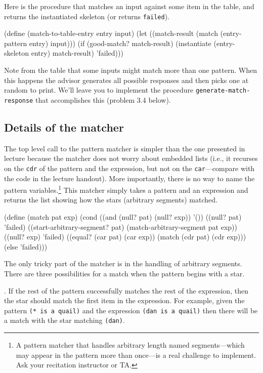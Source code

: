 Here is the procedure that matches an input against some item in the
table, and returns the instantiated skeleton (or returns {\tt failed}).

\beginlisp
(define (match-to-table-entry entry input)
  (let ((match-result (match (entry-pattern entry) input)))
    (if (good-match? match-result)
        (instantiate (entry-skeleton entry) match-result)
        'failed)))
\endlisp

Note from the table that some inputs might match more than one
pattern.  When this happens the advisor generates all possible
responses and then picks one at random to print.  We'll leave you to
implement the procedure {\tt generate-match-response} that
accomplishes this (problem 3.4 below).

\subsection{Details of the matcher}

The top level call to the pattern matcher is simpler than the one
presented in lecture because the matcher does not worry about
embedded lists (i.e., it recurses on the {\tt cdr} of the pattern and
the expression, but not on the {\tt car}---compare with the code in
the lecture handout).  More importantly, there is no way to name
the pattern variables.\footnote{A pattern matcher that handles
arbitrary length named segments---which may appear in the pattern more
than once---is a real challenge to implement.  Ask your recitation
instructor or TA.} This matcher simply takes a pattern and an
expression and returns the list showing how the stars (arbitrary
segments) matched.

\beginlisp
(define (match pat exp)
  (cond ((and (null? pat) (null? exp)) '())
        ((null? pat) 'failed)
        ((start-arbitrary-segment? pat) (match-arbitrary-segment pat exp))
        ((null? exp) 'failed)
        ((equal? (car pat) (car exp)) (match (cdr pat) (cdr exp)))
        (else 'failed)))
\endlisp

The only tricky part of the matcher is in the handling of arbitrary
segments.  There are three possibilities for a match when the pattern
begins with a star.

. If the rest of the pattern successfully matches the rest of the
expression, then the star should match the first item in the
expression.  For example, given the pattern {\tt (* is a quail)} and
the expression {\tt (dan is a quail)} then there will be a match with
the star matching {\tt (dan)}.

